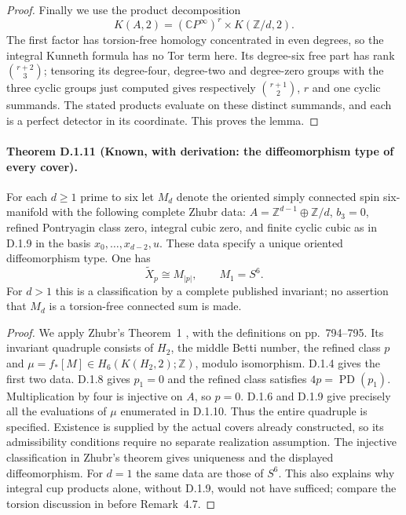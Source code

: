 \begin{proof}
Finally we use the product decomposition
\[
 K(A,2)=(\mathbb CP^\infty)^r\times K(\mathbb Z/d,2).
\]
The first factor has torsion-free homology concentrated in even
degrees, so the integral Kunneth formula has no Tor term here.
Its degree-six free part has rank $\binom{r+2}{3}$; tensoring its
degree-four, degree-two and degree-zero groups with the three
cyclic groups just computed gives respectively
$\binom{r+1}{2}$, $r$ and one cyclic summands. The stated products
evaluate on these distinct summands, and each is a perfect
detector in its coordinate. This proves the lemma.
\end{proof}

\paragraph{Theorem D.1.11 (Known, with derivation: the diffeomorphism type of every cover).}
For each $d\geq1$ prime to six let $M_d$ denote the oriented
simply connected spin six-manifold with the following complete
Zhubr data: $A=\mathbb Z^{d-1}\oplus\mathbb Z/d$, $b_3=0$,
refined Pontryagin class zero, integral cubic zero, and finite
cyclic cubic as in D.1.9 in the basis
$x_0,\ldots,x_{d-2},u$. These data specify a unique oriented
diffeomorphism type. One has
\[
 \widetilde X_p\cong M_{|p|},\qquad M_1=S^6.
\]
For $d>1$ this is a classification by a complete published invariant;
no assertion that $M_d$ is a torsion-free connected sum is made.
\begin{proof}
We apply Zhubr's Theorem~1 \cite{manZhubr75}, with the definitions
on pp.~794--795. Its invariant quadruple consists of $H_2$, the
middle Betti number, the refined class $p$ and
$\mu=f_*[M]\in H_6(K(H_2,2);\mathbb Z)$, modulo isomorphism.
D.1.4 gives the first two data. D.1.8 gives $p_1=0$ and the refined
class satisfies $4p=\operatorname{PD}(p_1)$. Multiplication by four
is injective on $A$, so $p=0$. D.1.6 and D.1.9 give precisely all
the evaluations of $\mu$ enumerated in D.1.10. Thus the entire
quadruple is specified. Existence is supplied by the actual covers
already constructed, so its admissibility conditions require no
separate realization assumption. The injective classification in
Zhubr's theorem gives uniqueness and the displayed diffeomorphism.
For $d=1$ the same data are those of $S^6$. This also explains why
integral cup products alone, without D.1.9, would not have sufficed;
compare the torsion discussion in \cite{manReiser24} before Remark~4.7.
\end{proof}

